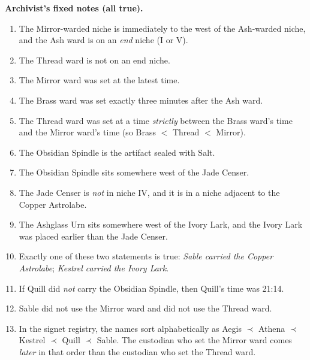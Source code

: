 \noindent\textbf{Archivist’s fixed notes (all true).}
\begin{enumerate}[leftmargin=*]
\item The Mirror-warded niche is immediately to the west of the Ash-warded niche, and the Ash ward is on an \emph{end} niche (I or V).
\item The Thread ward is not on an end niche.
\item The Mirror ward was set at the latest time.
\item The Brass ward was set exactly three minutes after the Ash ward.
\item The Thread ward was set at a time \emph{strictly} between the Brass ward’s time and the Mirror ward’s time (so Brass $<$ Thread $<$ Mirror).
\item The Obsidian Spindle is the artifact sealed with Salt.
\item The Obsidian Spindle sits somewhere west of the Jade Censer.
\item The Jade Censer is \emph{not} in niche IV, and it is in a niche adjacent to the Copper Astrolabe.
\item The Ashglass Urn sits somewhere west of the Ivory Lark, and the Ivory Lark was placed earlier than the Jade Censer.
\item Exactly one of these two statements is true: \emph{Sable carried the Copper Astrolabe}; \emph{Kestrel carried the Ivory Lark}.
\item If Quill did \emph{not} carry the Obsidian Spindle, then Quill’s time was 21:14.
\item Sable did not use the Mirror ward and did not use the Thread ward.
\item In the signet registry, the names sort alphabetically as
Aegis \(\prec\) Athena \(\prec\) Kestrel \(\prec\) Quill \(\prec\) Sable.
The custodian who set the Mirror ward comes \emph{later} in that order than the custodian who set the Thread ward.
\end{enumerate}

\medskip

